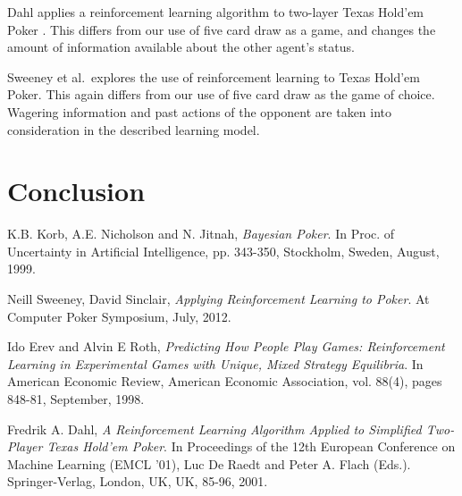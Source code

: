 \documentclass[12pt,pdftex,twocolumn]{article}
\begin{document}
Dahl applies a reinforcement learning algorithm to two-layer Texas Hold'em Poker \cite{Dahl01}. 
This differs from our use of five card draw as a game, and changes the amount of information available about the other agent's status. 

Sweeney et al.\ explores the use of reinforcement learning to Texas Hold'em Poker\cite{Sweeney}.
This again differs from our use of five card draw as the game of choice.  
Wagering information and past actions of the opponent are taken into consideration in the described learning model.

\section{Conclusion}



%
\begin{thebibliography}{9}
K.B. Korb, A.E. Nicholson and N. Jitnah,
 \emph{Bayesian Poker}. 
In Proc. of Uncertainty in Artificial Intelligence, pp. 343-350, 
Stockholm, Sweden, August, 1999.


Neill Sweeney, David Sinclair,
	\emph{Applying Reinforcement Learning to Poker}.
At Computer Poker Symposium, July, 2012.

Ido Erev and  Alvin E Roth, 
\emph{Predicting How People Play Games: Reinforcement Learning in Experimental Games with Unique, Mixed Strategy Equilibria}.
In American Economic Review, American Economic Association, vol. 88(4), pages 848-81, September, 1998.

Fredrik A. Dahl, 
\emph{A Reinforcement Learning Algorithm Applied to Simplified Two-Player Texas Hold'em Poker}. 
In Proceedings of the 12th European Conference on Machine Learning (EMCL '01), Luc De Raedt and Peter A. Flach (Eds.). Springer-Verlag, London, UK, UK, 85-96, 2001.
\end{thebibliography}
\end{document}

